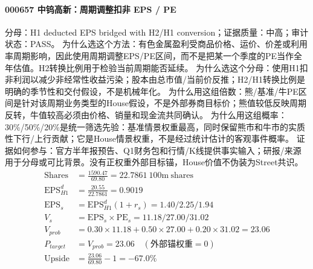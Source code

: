 \paragraph{000657 中钨高新：周期调整扣非 EPS / PE}
分母：H1 deducted EPS bridged with H2/H1 conversion；证据质量：中高；审计状态：PASS。
为什么选这个方法：有色金属盈利受商品价格、运价、价差或利用率周期影响，因此使用周期调整EPS/PE区间，而不是把某一个季度的PE当作全年估值。H2转换比例用于检验当前周期能否延续。
为什么选这个分母：使用H1扣非利润以减少非经常性收益污染；股本由总市值/当前价反推；H2/H1转换比例是明确的季节性和交付假设，不是机械年化。
为什么用这组倍数：熊/基准/牛PE区间是针对该周期业务类型的House假设，不是外部券商目标价；熊值较低反映周期反转，牛值较高必须由价格、销量和现金流共同确认。
为什么用这组概率：30\%/50\%/20\%是统一筛选先验：基准情景权重最高，同时保留熊市和牛市的实质性下行/上行贡献；它是House情景权重，不是经过统计估计的客观事件概率。
证据如何参与：官方半年报预告、Q1财务包和行情/K线提供事实输入；研报/来源用于分母或可比背景。没有正权重外部目标锚，House价值不伪装为Street共识。
\begin{align*}
\mathrm{Shares} &= \frac{1590.47}{69.80}=22.7861\ \mathrm{100m\ shares}\\
\mathrm{EPS}_{H1}^d &= \frac{20.55}{22.7861}=0.9019\\
\mathrm{EPS}_s &= \mathrm{EPS}_{H1}^d(1+r_s)=1.40/2.25/1.94\\
V_s &= \mathrm{EPS}_s\times \mathrm{PE}_s=11.18/27.00/31.02\\
V_{prob} &= 0.30\times 11.18+0.50\times 27.00+0.20\times 31.02=23.06\\
P_{target} &= V_{prob}=23.06\quad(\text{外部锚权重}=0)\\
\mathrm{Upside} &= \frac{23.06}{69.80}-1=-67.0\%\\
\end{align*}

